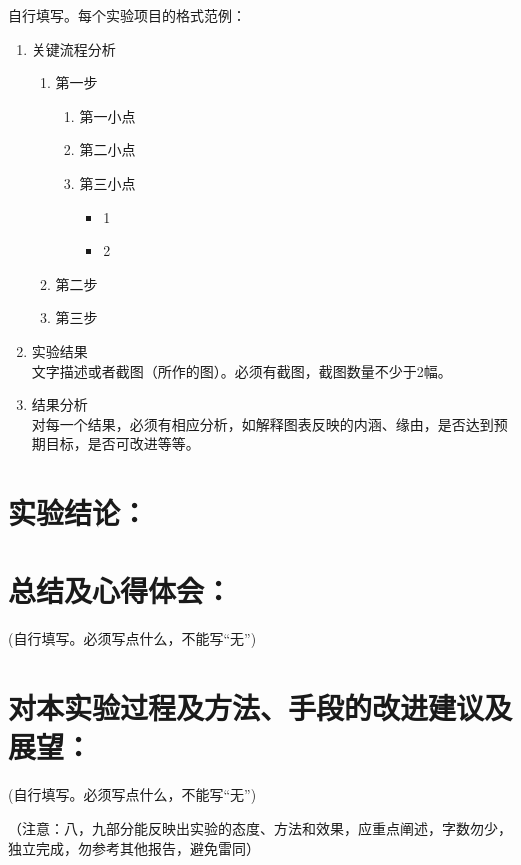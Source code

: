 \documentclass[a4paper,11pt,UTF8,AutoFakeBold]{ctexart}
\begin{document}
自行填写。每个实验项目的格式范例：
\begin{enumerate}
    \item 关键流程分析
    \begin{enumerate}
        \item 第一步
        \begin{enumerate}
            \item 第一小点
            \item 第二小点
            \item 第三小点
            \begin{itemize}
                \item 1
                \item 2
            \end{itemize}
        \end{enumerate}
        \item 第二步
        \item 第三步
    \end{enumerate}
    \item 实验结果 \\ 文字描述或者截图（所作的图）。必须有截图，截图数量不少于2幅。
    \item 结果分析 \\ 对每一个结果，必须有相应分析，如解释图表反映的内涵、缘由，是否达到预期目标，是否可改进等等。\\
\end{enumerate}

\section{实验结论：}

\section{总结及心得体会：}

(自行填写。必须写点什么，不能写“无”)\\

\section{对本实验过程及方法、手段的改进建议及展望：}

(自行填写。必须写点什么，不能写“无”)

（注意：八，九部分能反映出实验的态度、方法和效果，应重点阐述，字数勿少，独立完成，勿参考其他报告，避免雷同）
\end{document}

